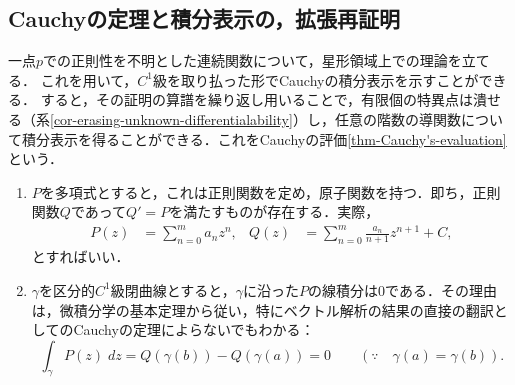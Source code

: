 \documentclass[uplatex, dvipdfmx]{jsreport}
\begin{document}
\subsection{Cauchyの定理と積分表示の，拡張再証明}

\begin{screen}
    一点$p$での正則性を不明とした連続関数について，星形領域上での理論を立てる．
    これを用いて，$C^1$級を取り払った形でCauchyの積分表示を示すことができる．
    すると，その証明の算譜を繰り返し用いることで，有限個の特異点は潰せる（系\ref{cor-erasing-unknown-differentialability}）し，任意の階数の導関数について積分表示を得ることができる．これをCauchyの評価\ref{thm-Cauchy's-evaluation}という．
\end{screen}

\begin{lemma}[多項式の定める正則関数]\mbox{}
    \begin{enumerate}
        \item $P$を多項式とすると，これは正則関数を定め，原子関数を持つ．即ち，正則関数$Q$であって$Q'=P$を満たすものが存在する．実際，
        \begin{align*}
            P(z)&=\sum^m_{n=0}a_nz^n,&Q(z)&=\sum^m_{n=0}\frac{a_n}{n+1}z^{n+1}+C,
        \end{align*}
        とすればいい．
        \item $\gamma$を区分的$C^1$級閉曲線とすると，$\gamma$に沿った$P$の線積分は$0$である．その理由は，微積分学の基本定理から従い，特にベクトル解析の結果の直接の翻訳としてのCauchyの定理によらないでもわかる：
        \[\int_\gamma P(z)\;dz=Q(\gamma(b))-Q(\gamma(a))=0\qquad(\because\quad\gamma(a)=\gamma(b)).\]
    \end{enumerate}
\end{lemma}
\end{document}
